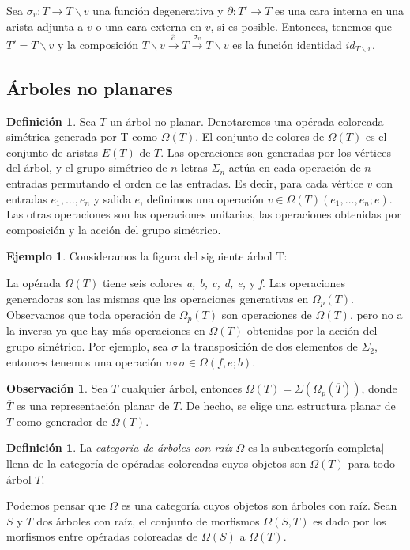 \documentclass[11pt,a4paper,openright,oneside]{article}
\numberwithin{equation}{section}
\theoremstyle{definition}
\newtheorem{defi}[teo]{Definici\'on}
\newtheorem{ex}[teo]{Ejemplo}
\newtheorem{obs}[teo]{Observaci\'on}
\begin{document}
Sea $\sigma_v\colon T\to T\backslash v$ una funci\'on degenerativa y $\partial\colon T' \to T$ es una cara interna en una arista adjunta a $v$ o una cara externa en $v$, si es posible. Entonces, tenemos que $T'=T\backslash v$ y la composici\'on
$    T\backslash v \overset{\partial}{\longrightarrow} T \overset{\sigma_v}{\longrightarrow} T\backslash v$ es la funci\'on identidad $id_{T\backslash v}$.


\subsection{\'Arboles no planares}
\begin{defi}
    Sea $T$ un \'arbol no-planar. Denotaremos una op\'erada coloreada sim\'etrica generada por T como $\Omega(T)$. El conjunto de colores de $\Omega(T)$ es el conjunto de aristas $E(T)$ de $T$.
    Las operaciones son generadas por los v\'ertices del \'arbol, y el grupo sim\'etrico de $n$ letras $\Sigma_n$ act\'ua en cada operaci\'on de $n$ entradas permutando el orden de las entradas.
    Es decir, para cada v\'ertice $v$ con entradas $e_1,\dots,e_n$ y salida $e$, definimos una operaci\'on $v\in \Omega(T)(e_1,\dots,e_n;e)$. Las otras operaciones son las operaciones unitarias, las operaciones obtenidas por composici\'on y la acci\'on del grupo sim\'etrico.
\end{defi}
\begin{ex}
    Consideramos la figura del siguiente \'arbol T:

    La op\'erada $\Omega(T)$ tiene seis colores \textit{a, b, c, d, e,} y \textit{f}. Las operaciones generadoras son las mismas que las operaciones generativas en $\Omega_p(T)$. Observamos que toda operaci\'on de $\Omega_p(T)$ son operaciones de $\Omega(T)$, pero no a la inversa ya que hay m\'as operaciones en $\Omega(T)$ obtenidas por la acci\'on del grupo sim\'etrico.
    Por ejemplo, sea $\sigma$ la transposici\'on de dos elementos de $\Sigma_2$, entonces tenemos una operaci\'on $v\circ\sigma\in\Omega(f,e;b)$.
\end{ex}
\begin{obs}
    Sea $T$ cualquier \'arbol, entonces $\Omega(T) = \Sigma(\Omega_p(\overline{T}))$, donde $\overline{T}$ es una representaci\'on planar de $T$. De hecho, se elige una estructura planar de $T$ como generador de $\Omega(T)$.
\end{obs}
\begin{defi}
    La \emph{categor\'ia de \'arboles con ra\'iz} $\Omega$ es la subcategor\'ia completa$|$llena de la categor\'ia de op\'eradas coloreadas cuyos objetos son $\Omega(T)$ para todo \'arbol $T$.

    Podemos pensar que $\Omega$ es una categor\'ia cuyos objetos son \'arboles con ra\'iz.
    Sean $S$ y $T$ dos \'arboles con ra\'iz, el conjunto de morfismos $\Omega(S, T)$ es dado por los morfismos entre op\'eradas coloreadas de $\Omega(S)$ a $\Omega(T)$.
\end{defi}
\end{document}
